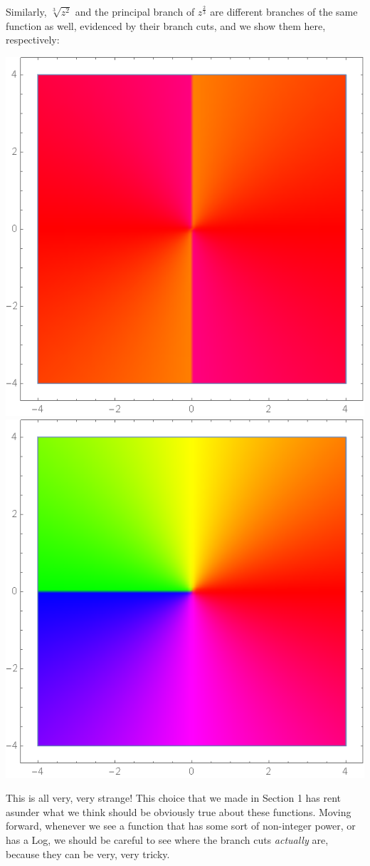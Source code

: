 \documentclass[12pt]{scrartcl}
\begin{document}
Similarly, $\sqrt[3]{z^2}$ and the principal branch of $z^{\frac{2}{3}}$ are different branches of the same function as well, evidenced by their branch cuts, and we show them here, respectively:
\begin{center}
	\includegraphics[scale=0.27]{images/cbrtzsqr1.png}
	\includegraphics[scale=0.27]{images/cbrtzsqr2.png}
\end{center}
This is all very, very strange! This choice that we made in Section 1 has rent asunder what we think should be obviously true about these functions. Moving forward, whenever we see a function that has some sort of non-integer power, or has a Log, we should be careful to see where the branch cuts \textit{actually} are, because they can be very, very tricky.
\end{document}
